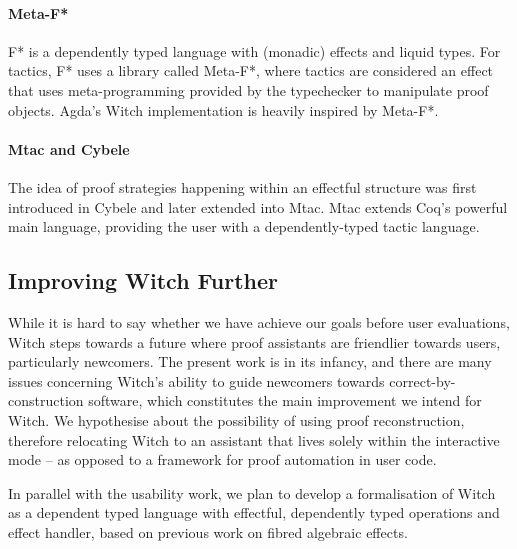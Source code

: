\documentclass[sigconfl]{acmart}
\begin{document}
\paragraph{Meta-F*} F* is a dependently typed language with (monadic) effects and liquid
types. For tactics, F* uses a library called Meta-F*, where tactics are
considered an effect that uses meta-programming provided by the typechecker to
manipulate proof objects. Agda's Witch implementation is heavily inspired by Meta-F*.

\paragraph{Mtac and Cybele} The idea of proof strategies happening within an
effectful structure was first introduced in Cybele and later extended into Mtac.
Mtac extends Coq's powerful main language, providing the user with a
dependently-typed tactic language.

\subsection{Improving Witch Further}
While it is hard to say whether we have achieve our goals before user
evaluations, Witch steps towards a future where proof assistants are
friendlier towards users, particularly newcomers. The present work is in its
infancy, and there are many issues concerning Witch's ability to guide newcomers
towards correct-by-construction software, which constitutes the main improvement
we intend for Witch. We hypothesise about the possibility of using proof
reconstruction, therefore relocating Witch to an assistant that lives solely
within the interactive mode -- as opposed to a framework for proof
automation in user code.

In parallel with the usability work, we plan to develop a formalisation of Witch
as a dependent typed language with effectful, dependently typed operations and
effect handler, based on previous work on fibred algebraic effects.
\end{document}
